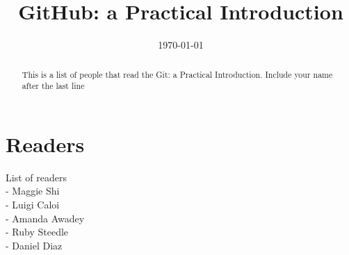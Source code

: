 \documentclass[12pt]{article}
\begin{document}
\title{GitHub: a Practical Introduction} 

\date{\today}

\maketitle 

\begin{abstract} 

	This is a list of people that read the Git: a Practical Introduction. Include your name after the last line
	
\end{abstract}

\section{Readers}
List of readers \\
- Maggie Shi \\
- Luigi Caloi  \\
- Amanda Awadey \\
- Ruby Steedle \\
- Daniel Diaz
	 
\end{document}
